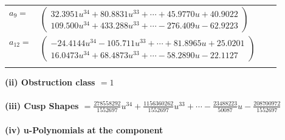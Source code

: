 \documentclass[1p]{elsarticle_modified}
\theoremstyle{definition}
\begin{document}
\begin{tabular}{m{7pt} m{180pt} m{7pt} m{180pt} }
\flushright $a_{9}=$&$\begin{pmatrix}32.3951 u^{34}+80.8831 u^{33}+\cdots+45.9770 u+40.9022\\109.500 u^{34}+433.288 u^{33}+\cdots-276.409 u-62.9223\end{pmatrix}$ \\
\flushright $a_{12}=$&$\begin{pmatrix}-24.4144 u^{34}-105.711 u^{33}+\cdots+81.8965 u+25.0201\\16.0473 u^{34}+68.4873 u^{33}+\cdots-58.2890 u-22.1127\end{pmatrix}$\\&\end{tabular}
\flushleft \textbf{(ii) Obstruction class $= 1$}\\~\\
\flushleft \textbf{(iii) Cusp Shapes $= \frac{278558292}{1552697} u^{34}+\frac{1156360262}{1552697} u^{33}+\cdots-\frac{23488223}{50087} u-\frac{208700972}{1552697}$}\\~\\
\newpage\renewcommand{\arraystretch}{1}
\flushleft \textbf{(iv) u-Polynomials at the component}\newline \\
\end{document}
